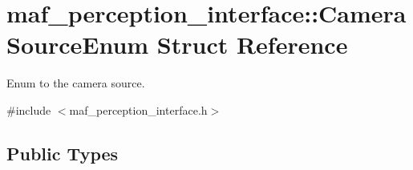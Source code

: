 \hypertarget{structmaf__perception__interface_1_1CameraSourceEnum}{}\section{maf\+\_\+perception\+\_\+interface\+:\+:Camera\+Source\+Enum Struct Reference}
\label{structmaf__perception__interface_1_1CameraSourceEnum}


Enum to the camera source.  




{\ttfamily \#include $<$maf\+\_\+perception\+\_\+interface.\+h$>$}

\subsection*{Public Types}
